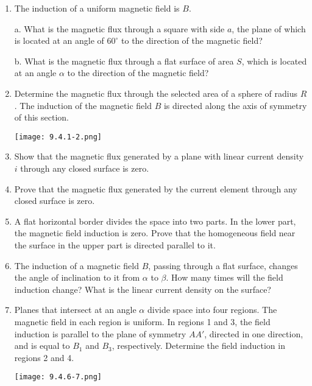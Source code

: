 \documentclass{article}
\begin{document}
\begin{enumerate}[label=9.4.\arabic*]

\item The induction of a uniform magnetic field is $B$.

a. What is the magnetic flux through a square with side $a$, the plane of which is located at an angle of $60^\circ$ to the direction of the magnetic field?

b. What is the magnetic flux through a flat surface of area $S$, which is located at an angle $\alpha$ to the direction of the magnetic field?

\item Determine the magnetic flux through the selected area of a sphere of radius $R$. The induction of the magnetic field $B$ is directed along the axis of symmetry of this section.

\begin{center}
    \texttt{[image: 9.4.1-2.png]}
\end{center}

\item Show that the magnetic flux generated by a plane with linear current density $i$ through any closed surface is zero.

\item Prove that the magnetic flux generated by the current element through any closed surface is zero.

\item A flat horizontal border divides the space into two parts. In the lower part, the magnetic field induction is zero. Prove that the homogeneous field near the surface in the upper part is directed parallel to it.

\item The induction of a magnetic field $B$, passing through a flat surface, changes the angle of inclination to it from $\alpha$ to $\beta$. How many times will the field induction change? What is the linear current density on the surface?

\item Planes that intersect at an angle $\alpha$ divide space into four regions. The magnetic field in each region is uniform. In regions 1 and 3, the field induction is parallel to the plane of symmetry $AA'$, directed in one direction, and is equal to $B_1$ and $B_3$, respectively. Determine the field induction in regions 2 and 4.

\begin{center}
    \texttt{[image: 9.4.6-7.png]}
\end{center}


\end{enumerate}
\end{document}
